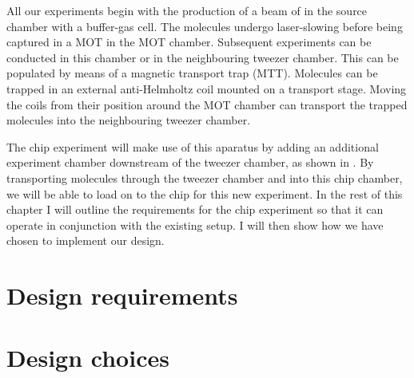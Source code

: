 All our experiments begin with the production of a beam of \CaF{} in the source
chamber with a buffer-gas cell. The molecules undergo laser-slowing before
being captured in a MOT in the MOT chamber. Subsequent experiments can be
conducted in this chamber or in the neighbouring tweezer chamber. This can be
populated by means of a magnetic transport trap (MTT).  Molecules can be
trapped in an external anti-Helmholtz coil mounted on a transport stage. Moving
the coils from their position around the MOT chamber can transport the trapped
molecules into the neighbouring tweezer chamber. 

The chip experiment will make use of this aparatus by adding an additional
experiment chamber downstream of the tweezer chamber, as shown in
. By transporting molecules through the
tweezer chamber and into this chip chamber, we will be able to load on to the
chip for this new experiment. In the rest of this chapter I will outline the
requirements for the chip experiment so that it can operate in conjunction with
the existing setup. I will then show how we have chosen to implement our
design.


\section{Design requirements}


\section{Design choices}

